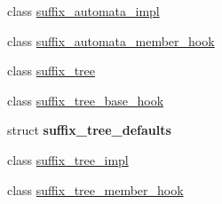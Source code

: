 \begin{DoxyCompactItemize}
class \hyperlink{classboost_1_1intrusive_1_1suffix__automata__impl}{suffix\+\_\+automata\+\_\+impl}
\item 
class \hyperlink{classboost_1_1intrusive_1_1suffix__automata__member__hook}{suffix\+\_\+automata\+\_\+member\+\_\+hook}
\item 
class \hyperlink{classboost_1_1intrusive_1_1suffix__tree}{suffix\+\_\+tree}
\item 
class \hyperlink{classboost_1_1intrusive_1_1suffix__tree__base__hook}{suffix\+\_\+tree\+\_\+base\+\_\+hook}
\item 
struct {\bfseries suffix\+\_\+tree\+\_\+defaults}
\item 
class \hyperlink{classboost_1_1intrusive_1_1suffix__tree__impl}{suffix\+\_\+tree\+\_\+impl}
\item 
class \hyperlink{classboost_1_1intrusive_1_1suffix__tree__member__hook}{suffix\+\_\+tree\+\_\+member\+\_\+hook}
\end{DoxyCompactItemize}
